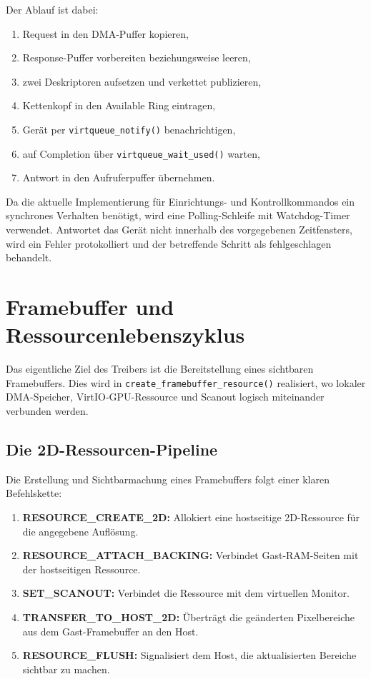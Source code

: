 Der Ablauf ist dabei:
\begin{enumerate}
    \item Request in den DMA-Puffer kopieren,
    \item Response-Puffer vorbereiten beziehungsweise leeren,
    \item zwei Deskriptoren aufsetzen und verkettet publizieren,
    \item Kettenkopf in den Available Ring eintragen,
    \item Gerät per \texttt{virtqueue\_notify()} benachrichtigen,
    \item auf Completion über \texttt{virtqueue\_wait\_used()} warten,
    \item Antwort in den Aufruferpuffer übernehmen.
\end{enumerate}

Da die aktuelle Implementierung für Einrichtungs- und Kontrollkommandos ein
synchrones Verhalten benötigt, wird eine Polling-Schleife mit Watchdog-Timer
verwendet. Antwortet das Gerät nicht innerhalb des vorgegebenen Zeitfensters,
wird ein Fehler protokolliert und der betreffende Schritt als fehlgeschlagen
behandelt.

\section{Framebuffer und Ressourcenlebenszyklus}
Das eigentliche Ziel des Treibers ist die Bereitstellung eines sichtbaren
Framebuffers. Dies wird in \texttt{create\_framebuffer\_resource()} realisiert,
wo lokaler DMA-Speicher, VirtIO-GPU-Ressource und Scanout logisch miteinander
verbunden werden.

\subsection{Die 2D-Ressourcen-Pipeline}
Die Erstellung und Sichtbarmachung eines Framebuffers folgt einer klaren
Befehlskette:
\begin{enumerate}
    \item \textbf{RESOURCE\_CREATE\_2D:} Allokiert eine hostseitige 2D-Ressource für die angegebene Auflösung.
    \item \textbf{RESOURCE\_ATTACH\_BACKING:} Verbindet Gast-RAM-Seiten mit der hostseitigen Ressource.
    \item \textbf{SET\_SCANOUT:} Verbindet die Ressource mit dem virtuellen Monitor.
    \item \textbf{TRANSFER\_TO\_HOST\_2D:} Überträgt die geänderten Pixelbereiche aus dem Gast-Framebuffer an den Host.
    \item \textbf{RESOURCE\_FLUSH:} Signalisiert dem Host, die aktualisierten Bereiche sichtbar zu machen.
\end{enumerate}

